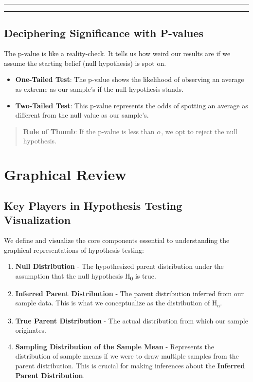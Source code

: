 \documentclass[
  letterpaper,
  DIV=11,
  numbers=noendperiod]{scrreprt}
\begin{document}
\begin{center}\rule{0.5\linewidth}{0.5pt}\end{center}

\begin{center}\rule{0.5\linewidth}{0.5pt}\end{center}

\subsection{Deciphering Significance with
P-values}\label{deciphering-significance-with-p-values}

The p-value is like a reality-check. It tells us how weird our results
are if we assume the starting belief (null hypothesis) is spot on.

\begin{itemize}
\item
  \textbf{One-Tailed Test}: The p-value shows the likelihood of
  observing an average as extreme as our sample's if the null hypothesis
  stands.
\item
  \textbf{Two-Tailed Test}: This p-value represents the odds of spotting
  an average as different from the null value as our sample's.
\end{itemize}

\begin{quote}
\textbf{Rule of Thumb}: If the p-value is less than \(\alpha\), we opt
to reject the null hypothesis.
\end{quote}

\section{Graphical Review}\label{graphical-review}

\subsection{Key Players in Hypothesis Testing
Visualization}\label{key-players-in-hypothesis-testing-visualization}

We define and visualize the core components essential to understanding
the graphical representations of hypothesis testing:

\begin{enumerate}
\def\labelenumi{\arabic{enumi}.}
\item
  \textbf{Null Distribution} - The hypothesized parent distribution
  under the assumption that the null hypothesis H\textsubscript{0} is
  true.
\item
  \textbf{Inferred Parent Distribution} - The parent distribution
  inferred from our sample data. This is what we conceptualize as the
  distribution of H\textsubscript{a}.
\item
  \textbf{True Parent Distribution} - The actual distribution from which
  our sample originates.
\item
  \textbf{Sampling Distribution of the Sample Mean} - Represents the
  distribution of sample means if we were to draw multiple samples from
  the parent distribution. This is crucial for making inferences about
  the \textbf{Inferred Parent Distribution}.
\end{enumerate}
\end{document}
